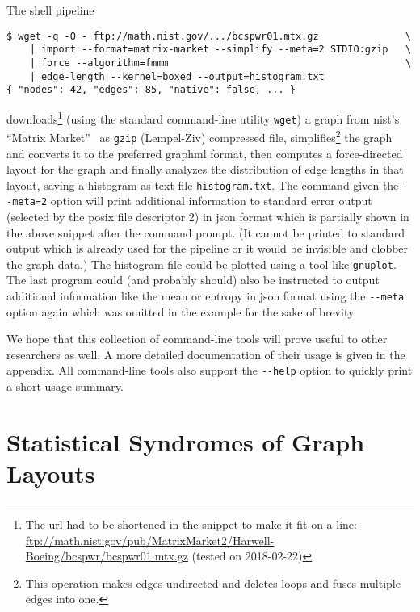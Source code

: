 \documentclass{graphstudy}
\begin{document}
The shell pipeline
\begin{lstlisting}
$ wget -q -O - ftp://math.nist.gov/.../bcspwr01.mtx.gz               \
    | import --format=matrix-market --simplify --meta=2 STDIO:gzip   \
    | force --algorithm=fmmm                                         \
    | edge-length --kernel=boxed --output=histogram.txt
{ "nodes": 42, "edges": 85, "native": false, ... }
\end{lstlisting}
downloads\footnote{%
  The \acs{url} had to be shortened in the snippet to make it fit on a line:
  \url{ftp://math.nist.gov/pub/MatrixMarket2/Harwell-Boeing/bcspwr/bcspwr01.mtx.gz}
  (tested on 2018-02-22)
}
(using the standard command-line utility \verb`wget`) a graph from \acs{nist}'s \enquote{Matrix
  Market}~\cite{MatrixMarket} as \verb`gzip` (Lempel-Ziv) compressed file, simplifies\footnote{%
  This operation makes edges undirected and deletes loops and fuses multiple edges into one.
}
the graph and converts it to the preferred \ac{graphml} format, then computes a force-directed layout for the graph and
finally analyzes the distribution of edge lengths in that layout, saving a histogram as text file \verb`histogram.txt`.
The command given the \verb`--meta=2` option will print additional information to standard error output (selected by the
\acs{posix} file descriptor 2) in \acs{json} format which is partially shown in the above snippet after the command
prompt.  (It cannot be printed to standard output which is already used for the pipeline or it would be invisible and
clobber the graph data.)  The histogram file could be plotted using a tool like \verb`gnuplot`.  The last program could
(and probably should) also be instructed to output additional information like the mean or entropy in \acs{json} format
using the \verb`--meta` option again which was omitted in the example for the sake of brevity.

We hope that this collection of command-line tools will prove useful to other researchers as well.  A more detailed
documentation of their usage is given in the appendix.  All command-line tools also support the \verb`--help` option to
quickly print a short usage summary.

\chapter{Statistical Syndromes of Graph Layouts}
\label{chap:syndromes}
\end{document}
